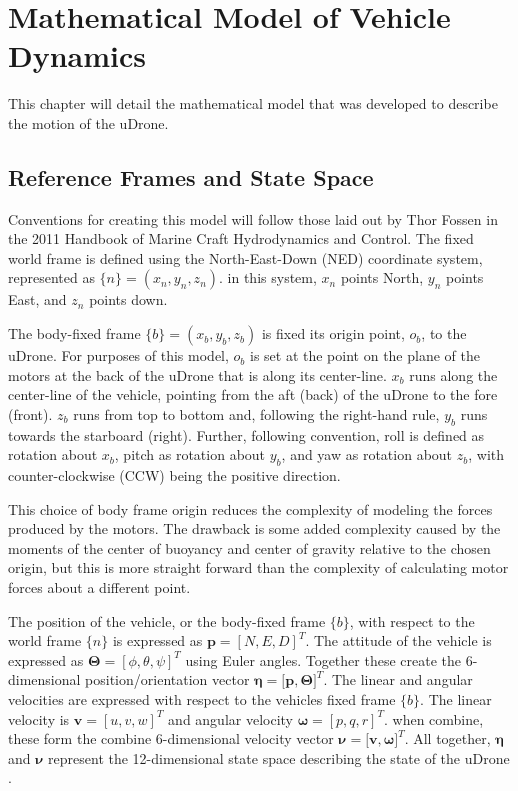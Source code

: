 \chapter{Mathematical Model of Vehicle Dynamics}

This chapter will detail the mathematical model that was developed to describe the motion of the uDrone. 

\section{Reference Frames and State Space}

Conventions for creating this model will follow those laid out by Thor Fossen in the 2011 Handbook of Marine Craft Hydrodynamics and Control. The fixed world frame is defined using the North-East-Down (NED) coordinate system, represented as $\{n\} = (x_n, y_n, z_n)$. in this system, $x_n$ points North, $y_n$ points East, and $z_n$ points down. 

The body-fixed frame $\{b\} = (x_b, y_b, z_b)$ is fixed its origin point, $o_b$, to the uDrone. For purposes of this model, $o_b$ is set at the point on the plane of the motors at the back of the uDrone that is along its center-line. $x_b$ runs along the center-line of the vehicle, pointing from the aft (back) of the uDrone to the fore (front). $z_b$ runs from top to bottom and, following the right-hand rule, $y_b$ runs towards the starboard (right). Further, following convention, roll is defined as rotation about $x_b$, pitch as rotation about $y_b$, and yaw as rotation about $z_b$, with counter-clockwise (CCW) being the positive direction. 

This choice of body frame origin reduces the complexity of modeling the forces produced by the motors. The drawback is some added complexity caused by the moments of the center of buoyancy and center of gravity relative to the chosen origin, but this is more straight forward than the complexity of calculating motor forces about a different point.

The position of the vehicle, or the body-fixed frame $\{b\}$, with respect to the world frame $\{n\}$ is expressed as $\bm{p} = [N, E, D]^T$. The attitude of the vehicle is expressed as $\bm{\Theta} = [\phi, \theta, \psi]^T$ using Euler angles. Together these create the 6-dimensional position/orientation vector $\bm{\eta} = [\bm{p}, \bm{\Theta]}^T$. The linear and angular velocities are expressed with respect to the vehicles fixed frame $\{b\}$. The linear velocity is $\bm{v} = [u, v, w]^T$ and angular velocity $\bm{\omega} = [p, q, r]^T$. when combine, these form the combine 6-dimensional velocity vector $\bm{\nu}= [\bm{v}, \bm{\omega]}^T$. All together, $\boldsymbol{\eta}$ and $\boldsymbol{\nu}$ represent the 12-dimensional state space describing the state of the uDrone \parencite{thor_kin}. 

